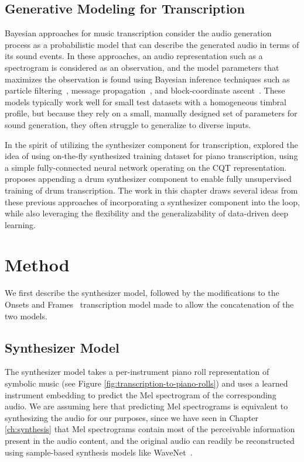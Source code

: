 \subsection{Generative Modeling for Transcription}

Bayesian approaches for music transcription consider the audio generation process as a probabilistic model that can describe the generated audio in terms of its sound events.
In these approaches, an audio representation such as a spectrogram is considered as an observation, and the model parameters that maximizes the observation is found using Bayesian inference techniques such as particle filtering~\cite{dubois2005harmonic}, message propagation~\cite{cemgil2006generative}, and block-coordinate ascent~\cite{bergkirkpatrick2014unsupervised}.
These models typically work well for small test datasets with a homogeneous timbral profile, but because they rely on a small, manually designed set of parameters for sound generation, they often struggle to generalize to diverse inputs.

In the spirit of utilizing the synthesizer component for transcription,
 explored the idea of using on-the-fly synthesized training dataset for piano transcription, using a simple fully-connected neural network operating on the CQT representation.
\cite{choi2019drum} proposes appending a drum synthesizer component to enable fully unsupervised training of drum transcription.
The work in this chapter draws several ideas from these previous approaches of incorporating a synthesizer component into the loop, while also leveraging the flexibility and the generalizability of data-driven deep learning.

\section{Method}

We first describe the synthesizer model, followed by the modifications to the Onsets and Frames~\cite{hawthorne2018onsetsframes} transcription model made to allow the concatenation of the two models.

\subsection{Synthesizer Model}

The synthesizer model takes a per-instrument piano roll representation of symbolic music (see Figure \ref{fig:transcription-to-piano-rolls}) and uses a learned instrument embedding to predict the Mel spectrogram of the corresponding audio.
We are assuming here that predicting Mel spectrograms is equivalent to synthesizing the audio for our purposes, since we have seen in Chapter \ref{ch:synthesis} that Mel spectrograms contain most of the perceivable information present in the audio content, and the original audio can readily be reconstructed using sample-based synthesis models like WaveNet~\cite{oord2016wavenet}.

